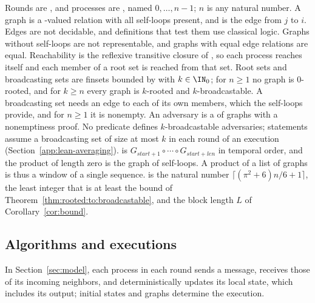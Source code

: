 Rounds are , and processes are , named $0,\dots,n-1$; $n$ is any natural number. A graph is a -valued relation with all self-loops present, and  is the edge from $j$ to $i$. Edges are not decidable, and definitions that test them use classical logic. Graphs without self-loops are not representable, and graphs with equal edge relations are equal. Reachability is the reflexive transitive closure of , so each process reaches itself and each member of a root set is reached from that set. Root sets and broadcasting sets are finsets bounded by  with $k\in\IN_0$; for $n\geq1$ no graph is $0$-rooted, and for $k\geq n$ every graph is $k$-rooted and $k$-broadcastable. A broadcasting set needs an edge to each of its own members, which the self-loops provide, and for $n\geq1$ it is nonempty. An adversary is a  of graphs with a nonemptiness proof. No predicate defines $k$-broadcastable adversaries; statements assume a broadcasting set of size at most $k$ in each round of an execution (Section~\ref{app:lean-averaging}).  is $G_{\mathit{start}+1}\circ\cdots\circ G_{\mathit{start}+\mathit{len}}$ in temporal order, and the product of length zero is the graph  of self-loops. A product of a list of graphs is thus a window of a single sequence.  is the natural number $\lceil(\pi^2+6)n/6+1\rceil$, the least integer that is at least the bound of Theorem~\ref{thm:rooted:to:broadcastable}, and the block length $L$ of Corollary~\ref{cor:bound}.

\subsection{Algorithms and executions}\label{app:lean-algorithms}

In Section~\ref{sec:model}, each process in each round sends a message, receives those of its incoming neighbors, and deterministically updates its local state, which includes its output; initial states and graphs determine the execution.

